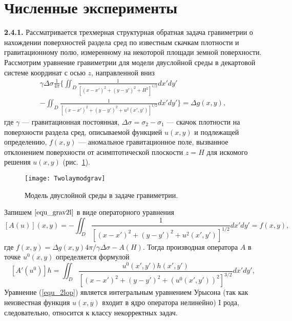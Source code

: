 \newpage
\section{Численные эксперименты}

{\bfseries 2.4.1.} Рассматривается трехмерная структурная обратная задача гравиметрии о нахождении поверхностей раздела сред по известным скачкам плотности и гравитационному полю, измеренному на некоторой площади земной поверхности.
Рассмотрим уравнение гравиметрии для модели двуслойной среды в декартовой системе координат с осью $z$, направленной вниз 
\begin{equation}\label{equ_grav2l}
\begin{aligned}
\gamma\Delta\sigma\frac{1}{4\pi} \bigg\{ \iint_{D} \frac{1}{[(x-x')^2+(y-y')^2+H^2]^{1/2}}dx'dy' \\
- 
\iint_{D} \frac{1}{[(x-x')^2+(y-y')^2+u^2(x',y')]^{1/2}}dx'dy'\bigg\}=\Delta g(x,y),
\end{aligned} 
\end{equation}
где $\gamma$ --- гравитационная постоянная, $\Delta\sigma=\sigma_2-\sigma_1$ --- скачок плотности на поверхности раздела сред, описываемой функцией $u(x,y)$ и подлежащей определению, $f(x,y)$ --- аномальное гравитационное поле, вызванное отклонением поверхности от асимптотической плоскости $z=H$ для искомого решения $u(x,y)$ (рис.~\ref{fig:twolayergrav}). 
\begin{figure}[h]
	\centering
	\texttt{[image: Twolaymodgrav]}
	\caption{Модель двуслойной среды в задаче гравиметрии.}
	\label{fig:twolayergrav}
	\end{figure}
Запишем $\eqref{equ_grav2l}$ в виде операторного уравнения
\begin{equation}\label{equ_2lop}
	[A(u)](x,y)=-\iint_{D} \frac{1}{[(x-x')^2+(y-y')^2+u^2(x',y')]^{1/2}}dx'dy'=f(x,y),
\end{equation}
где $f(x,y)=\Delta g(x,y) 4\pi/\gamma\Delta\sigma - A(H)$. Тогда производная оператора $A$ в точке $u^0(x,y)$ определяется формулой
$$ [A'(u^0)]h=\iint_{D} \frac{u^0(x',y')h(x',y')}{[(x-x')^2+(y-y')^2+(u^0(x',y'))^2]^{3/2}}dx'dy', $$
Уравнение (\ref{equ_2lop}) является интегральным уравнением Урысона (так как неизвестная функция $u(x,y)$ входит в ядро оператора нелинейно) I рода, следовательно, относится к классу некорректных задач.
	
